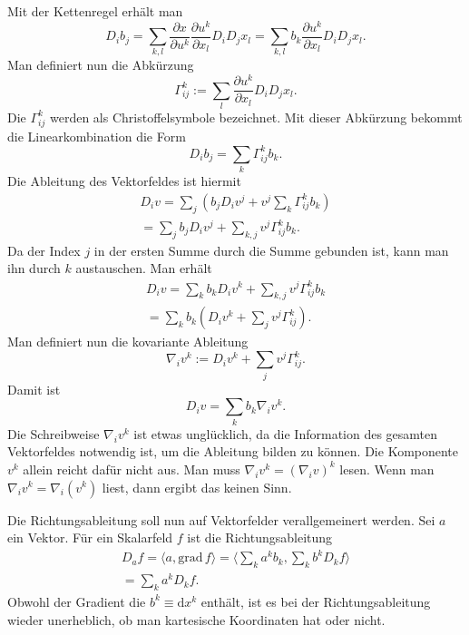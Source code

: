 \documentclass[a4paper,10pt,fleqn,twocolumn,twoside]{article}
\numberwithin{equation}{section}
\begin{document}
Mit der Kettenregel erhält man
\begin{equation}
D_ib_j = \sum_{k,l}\frac{\partial x}{\partial u^k}
\frac{\partial u^k}{\partial x_l}D_iD_j x_l
= \sum_{k,l}b_k\frac{\partial u^k}{\partial x_l}D_iD_j x_l.
\end{equation}
Man definiert nun die Abkürzung
\begin{equation}
\Gamma_{ij}^k := \sum_{l}\frac{\partial u^k}
{\partial x_l}D_iD_j x_l.
\end{equation}
Die $\Gamma_{ij}^k$ werden als Christoffelsymbole bezeichnet.
Mit dieser Abkürzung bekommt die Linearkombination die Form
\begin{equation}
D_ib_j = \sum_{k} \Gamma_{ij}^k b_k.
\end{equation}
Die Ableitung des Vektorfeldes ist hiermit
\begin{gather}
D_i v  = \sum_{j}(b_jD_i v^j+v^j\sum_{k} \Gamma_{ij}^k b_k)\\
= \sum_{j}b_jD_i v^j+\sum_{k,j}v^j \Gamma_{ij}^k b_k.
\end{gather}
Da der Index $j$ in der ersten Summe durch die Summe gebunden ist,
kann man ihn durch $k$ austauschen. Man erhält
\begin{gather}
D_i v = \sum_{k}b_kD_i v^k+\sum_{k,j}v^j \Gamma_{ij}^k b_k\\
= \sum_{k}b_k(D_i v^k+\sum_{j}v^j\Gamma_{ij}^k).
\end{gather}
Man definiert nun die kovariante Ableitung
\begin{equation}
\nabla_i v^k := D_i v^k+\sum_{j}v^j\Gamma_{ij}^k.
\end{equation}
Damit ist
\begin{equation}
D_i v = \sum_{k}b_k\nabla_i v^k.
\end{equation}
Die Schreibweise $\nabla_i v^k$ ist etwas unglücklich, da die
Information des gesamten Vektorfeldes notwendig ist, um die Ableitung
bilden zu können. Die Komponente $v^k$ allein reicht dafür nicht
aus. Man muss $\nabla_i v^k=(\nabla_i v)^k$ lesen. Wenn man
$\nabla_i v^k=\nabla_i(v^k)$ liest, dann ergibt das keinen Sinn.

Die Richtungsableitung soll nun auf Vektorfelder verallgemeinert
werden. Sei $a$ ein Vektor. Für ein Skalarfeld $f$ ist die
Richtungsableitung
\begin{gather*}
{D_a}f = \langle a,\mathrm{grad}\,f\rangle
= \langle \sum_k a^kb_k,\sum_k b^k D_k f\rangle\\
= \sum_k a^k D_k f.
\end{gather*}
Obwohl der Gradient die $b^k\equiv\mathrm dx^k$ enthält, ist es bei
der Richtungsableitung wieder unerheblich, ob man kartesische
Koordinaten hat oder nicht.
\end{document}
